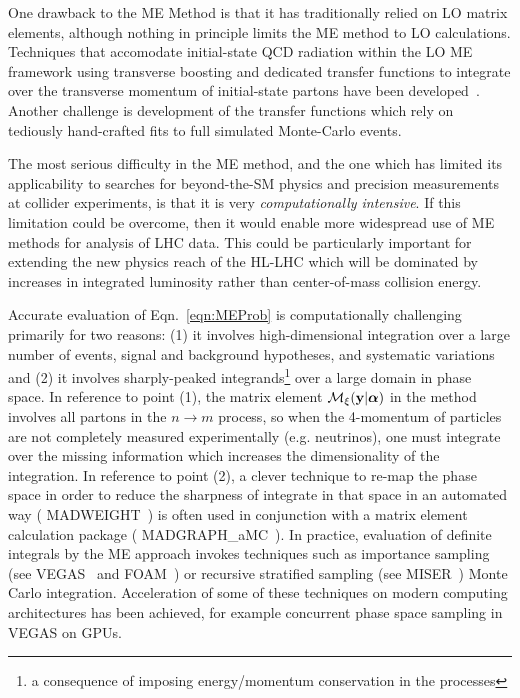 One drawback to the ME Method is that it has traditionally relied on
LO matrix elements, although nothing in principle limits the ME method
to LO calculations. Techniques that accomodate initial-state QCD
radiation within the LO ME framework using transverse boosting and
dedicated transfer functions to integrate over the transverse momentum
of initial-state partons have been developed~\cite{Alwall:2010cq}.
Another challenge is development of the transfer functions which rely
on tediously hand-crafted fits to full simulated Monte-Carlo events.

The most serious difficulty in the ME method, and the one which has
limited its applicability to searches for beyond-the-SM physics and
precision measurements at collider experiments, is that it is
very \emph{computationally intensive}. If this limitation could be
overcome, then it would enable more widespread use of ME methods for
analysis of LHC data. This could be particularly important for
extending the new physics reach of the HL-LHC which will be dominated
by increases in integrated luminosity rather than center-of-mass
collision energy.

Accurate evaluation of Eqn.~\ref{eqn:MEProb} is computationally
challenging primarily for two reasons: (1) it involves
high-dimensional integration over a large number of events, signal and
background hypotheses, and systematic variations and (2) it involves
sharply-peaked integrands\footnote{a consequence of imposing
energy/momentum conservation in the processes} over a large domain in
phase space. In reference to point (1), the matrix element
$\mathcal{M}_{\xi}({\bf y}|\boldsymbol\alpha)$ in the method involves
all partons in the $n\rightarrow m$ process, so when the 4-momentum of
particles are not completely measured experimentally (e.g. neutrinos),
one must integrate over the missing information which increases the
dimensionality of the integration. In reference to point (2), a clever
technique to re-map the phase space in order to reduce the sharpness
of integrate in that space in an automated way ({\sf
MADWEIGHT}~\cite{Artoisenet:2010cn}) is often used in conjunction with
a matrix element calculation package ({\sf
MADGRAPH\_aMC\@NLO}~\cite{Alwall:2014hca}). In practice, evaluation of
definite integrals by the ME approach invokes techniques such as
importance sampling (see {\sf
VEGAS}~\cite{PETERLEPAGE1978192,Ohl:1998jn} and {\sf
FOAM}~\cite{JADACH200355}) or recursive stratified sampling (see
MISER~\cite{Press:1989vk}) Monte Carlo integration. Acceleration of
some of these techniques on modern computing architectures has been
achieved, for example concurrent phase space sampling in VEGAS on
GPUs.


